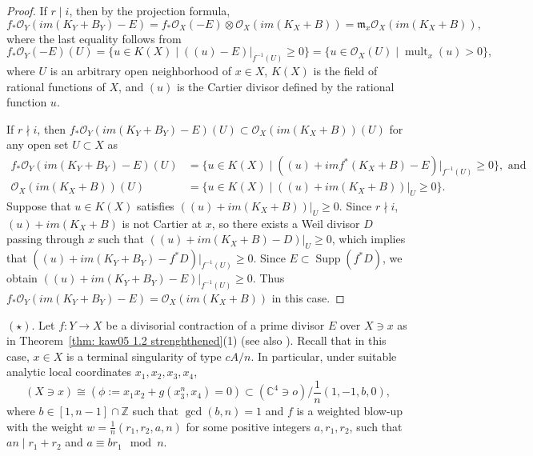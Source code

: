 \documentclass[11pt]{amsart}
\numberwithin{equation}{section}
\newcommand{\Zz}{\mathbb{Z}}
\newcommand{\Supp}{\operatorname{Supp}}
\newcommand{\mult}{\operatorname{mult}}
\theoremstyle{definition}
\theoremstyle{definition}
\begin{document}
\begin{proof}
If $r\mid i$, then by the projection formula, $$f_*\mathcal{O}_Y(im(K_Y+B_Y)-E)=f_*\mathcal{O}_X(-E)\otimes \mathcal{O}_X(im(K_X+B))=\mathfrak{m}_x\mathcal{O}_X(im(K_X+B)),$$ where the last equality follows from $$f_*\mathcal{O}_Y(-E)(U)=\{u\in K(X)\mid ((u)-E)|_{f^{-1}(U)}\geq 0\}=\{u\in \mathcal{O}_X(U)\mid \mult_x (u)>0\},$$ where $U$ is an arbitrary open neighborhood of $x\in X$, $K(X)$ is the field of rational functions of $X$, and $(u)$ is the Cartier divisor defined by the rational function $u$.

If $r\nmid i$, then $f_*\mathcal{O}_Y(im(K_Y+B_Y)-E)(U)\subset\mathcal{O}_X(im(K_X+B))(U)$ for any open set $U\subset X$ as
\begin{align*}
    f_*\mathcal{O}_Y(im(K_Y+B_Y)-E)(U)&=\{u\in K(X)\mid ((u)+imf^*(K_X+B)-E)|_{f^{-1}(U)}\geq 0\}, \text{ and}\\
    \mathcal{O}_X(im(K_X+B))(U)&=\{u\in K(X)\mid ((u)+im(K_X+B))|_U\geq 0\}.
\end{align*}
  Suppose that $u\in K(X)$ satisfies $((u)+im(K_X+B))|_U\geq 0$. Since $r\nmid i$, $(u)+im(K_X+B)$ is not Cartier at $x$, so there exists a Weil divisor $D$ passing through $x$ such that $((u)+im(K_X+B)-D)|_U\geq 0$, which implies that $((u)+im(K_Y+B_Y)-f^*D)|_{f^{-1}(U)}\geq 0$. Since $E\subset \Supp (f^*D)$, we obtain $((u)+im(K_Y+B_Y)-E)|_{f^{-1}(U)}\geq 0$. Thus $f_*\mathcal{O}_Y(im(K_Y+B_Y)-E)=\mathcal{O}_X(im(K_X+B))$ in this case.
\end{proof}

\medskip

 $(\star).$ Let $f: Y\to X$ be a divisorial contraction of a prime divisor $E$ over $X\ni x$ as in Theorem~\ref{thm: kaw05 1.2 strenghthened}(1) (see also \cite[Theorem~1.2(1)]{Kaw05}). Recall that in this case, $x\in X$ is a terminal singularity of type $cA/n$. In particular, under suitable analytic local coordinates $x_1,x_2,x_3,x_4$, $$(X\ni x)\cong (\phi:= x_1x_2+g(x_3^n,x_4)=0)\subset (\mathbb C^4\ni o)/\frac{1}{n}(1,-1,b,0),$$ where $b\in [1,n-1]\cap\Zz$ such that $\gcd(b,n)=1$ and $f$ is a weighted blow-up with the weight   $w=\frac{1}{n}(r_1,r_2,a,n)$ for some positive integers $a,r_1,r_2$, such that $an\mid r_1+r_2$ and $a\equiv br_1\mod n$.
\end{document}
